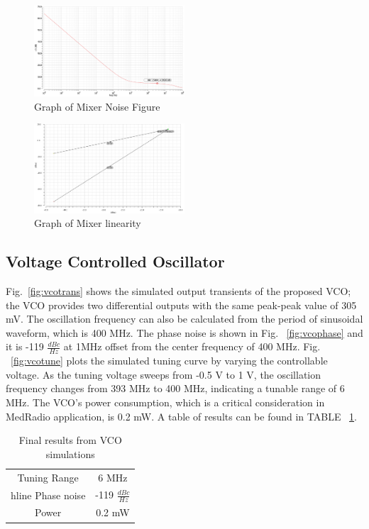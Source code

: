 \begin{figure}[h]
   \centering
    \includegraphics[width=0.5\textwidth]{figures/MixerNoiseFigure.png}
    \caption{Graph of Mixer Noise Figure}
    \label{fig:mixernoise}
\end{figure}

\begin{figure}[h]
   \centering
    \includegraphics[width=0.5\textwidth]{figures/mixerIIP3.png}
    \caption{Graph of Mixer linearity}
    \label{fig:mixerlin}
\end{figure}

\subsection{Voltage Controlled Oscillator}
Fig.~\ref{fig:vcotrans} shows the simulated output transients of the proposed VCO; the VCO provides two differential outputs with the same peak-peak value of 305 mV. The oscillation frequency can also be calculated from the period of sinusoidal waveform, which is 400 MHz. The phase noise is shown in Fig. ~\ref{fig:vcophase} and it is -119 $\frac{dBc}{Hz}$ at 1MHz offset from the center frequency of 400 MHz. Fig. ~\ref{fig:vcotune} plots the simulated tuning curve by varying the controllable voltage. As the tuning voltage sweeps from -0.5 V to 1 V, the oscillation frequency changes from 393 MHz to 400 MHz, indicating a tunable range of 6 MHz. The VCO’s power consumption, which is a critical consideration in MedRadio application, is 0.2 mW. A table of results can be found in TABLE ~\ref{tab:vcoresults}.

\begin{table}[h]
\begin{center}
	\begin{tabular}{ |c | c | }
 		\hline                      
  		Tuning Range &  6 MHz \\hline
  		Phase noise &  -119 $\frac{dBc}{Hz}$ \\ \hline
		Power & 0.2 mW \\ 
  		\hline  
	\end{tabular}

\end{center}
\caption{Final results from VCO simulations}
\label{tab:vcoresults}
\end{table}

